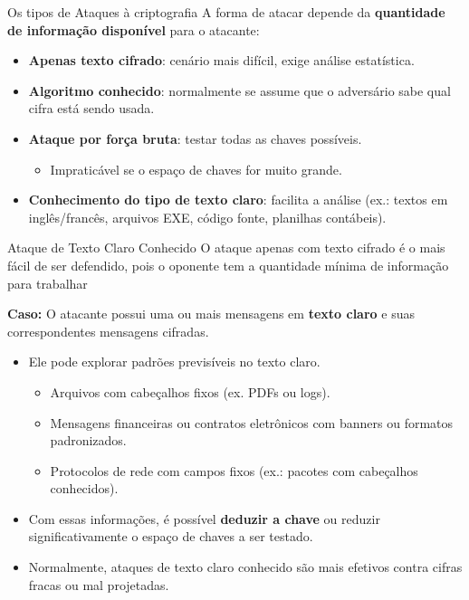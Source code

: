 \begin{frame}{Os tipos de Ataques à criptografia}
    A forma de atacar depende da \textbf{quantidade de informação disponível} para o atacante:

    \begin{itemize}
        \item \textbf{Apenas texto cifrado}: cenário mais difícil, exige análise estatística.
        \item \textbf{Algoritmo conhecido}: normalmente se assume que o adversário sabe qual cifra está sendo usada.
        \item \textbf{Ataque por força bruta}: testar todas as chaves possíveis.
              \begin{itemize}
                  \item Impraticável se o espaço de chaves for muito grande.
              \end{itemize}
        \item \textbf{Conhecimento do tipo de texto claro}: facilita a análise (ex.: textos em inglês/francês, arquivos EXE, código fonte, planilhas contábeis).
    \end{itemize}
\end{frame}


\begin{frame}{Ataque de Texto Claro Conhecido }
    O ataque apenas com texto cifrado é o mais fácil de ser defendido, pois o oponente tem a quantidade mínima de informação para trabalhar

    \textbf{Caso:} O atacante possui uma ou mais mensagens em \textbf{texto claro} e suas correspondentes mensagens cifradas.
    \begin{itemize}
        \item Ele pode explorar padrões previsíveis no texto claro.
              \begin{itemize}
                  \item Arquivos com cabeçalhos fixos (ex. PDFs ou logs).
                  \item Mensagens financeiras ou contratos eletrônicos com banners ou formatos padronizados.
                  \item Protocolos de rede com campos fixos (ex.: pacotes com cabeçalhos conhecidos).
              \end{itemize}
        \item Com essas informações, é possível \textbf{deduzir a chave} ou reduzir significativamente o espaço de chaves a ser testado.
        \item Normalmente, ataques de texto claro conhecido são mais efetivos contra cifras fracas ou mal projetadas.
    \end{itemize}

\end{frame}

